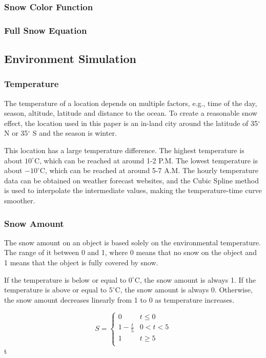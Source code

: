 \documentclass{article}
\begin{document}
\subsubsection {Snow Color Function}

\subsubsection {Full Snow Equation}

\subsection {Environment Simulation}

\subsubsection {Temperature}
The temperature of a location depends on multiple factors, e.g., time of the day, season, altitude, 
latitude and distance to the ocean. To create a reasonable snow effect, the location used in this paper 
is an in-land city around the latitude of 35$^{\circ}$ N or 35$^{\circ}$ S and the season is winter.

This location has a large temperature difference. The highest temperature is about 
\(10^\circ\mathrm{C}\), which can be reached at around 1-2 P.M. The lowest temperature is about 
\(-10^\circ\mathrm{C}\), which can be reached at around 5-7 A.M. The hourly temperature data can be
obtained on weather forecast websites, and the Cubic Spline method is used to interpolate the 
intermediate values, making the temperature-time curve smoother.

\subsubsection {Snow Amount}
The snow amount on an object is based solely on the environmental temperature. 
The range of it between 0 and 1, where 0 means that no snow on the object and 1 means
that the object is fully covered by snow.

If the temperature is below or equal to \(0^\circ\mathrm{C}\), the snow amount is always 1. 
If the temperature is above or equal to \(5^\circ\mathrm{C}\), the snow amount is always 0. 
Otherwise, the snow amount decreases linearly from 1 to 0 as temperature increases.

\[
  S=
  \left\{
    \begin{array}{ll}
      0 & t\leq 0 \\
      1 - \frac{t}{5} &  0 < t < 5 \\
      1 & t\geq 5 \\
    \end{array} 
  \right. 
\]
 t 
\end{document}
